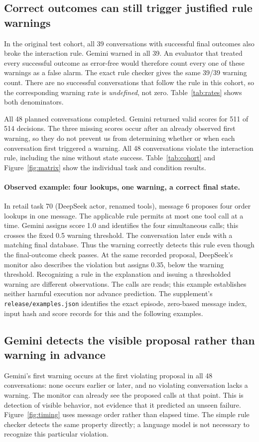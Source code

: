 \subsection{Correct outcomes can still trigger justified rule warnings}
In the original test cohort, all 39 conversations with successful final outcomes also broke the interaction rule. Gemini warned in all 39. An evaluator that treated every successful outcome as error-free would therefore count every one of these warnings as a false alarm. The exact rule checker gives the same 39/39 warning count. There are no successful conversations that follow the rule in this cohort, so the corresponding warning rate is \emph{undefined}, not zero. Table~\ref{tab:rates} shows both denominators.

All 48 planned conversations completed. Gemini returned valid scores for 511 of 514 decisions. The three missing scores occur after an already observed first warning, so they do not prevent us from determining whether or when each conversation first triggered a warning. All 48 conversations violate the interaction rule, including the nine without state success. Table~\ref{tab:cohort} and Figure~\ref{fig:matrix} show the individual task and condition results.

\paragraph{Observed example: four lookups, one warning, a correct final state.}
In retail task 70 (DeepSeek actor, renamed tools), message 6 proposes four order lookups in one message. The applicable rule permits at most one tool call at a time. Gemini assigns score 1.0 and identifies the four simultaneous calls; this crosses the fixed 0.5 warning threshold. The conversation later ends with a matching final database. Thus the warning correctly detects this rule even though the final-outcome check passes. At the same recorded proposal, DeepSeek's monitor also describes the violation but assigns 0.35, below the warning threshold. Recognizing a rule in the explanation and issuing a thresholded warning are different observations. The calls are reads; this example establishes neither harmful execution nor advance prediction. The supplement's \texttt{release/examples.json} identifies the exact episode, zero-based message index, input hash and score records for this and the following examples.

\subsection{Gemini detects the visible proposal rather than warning in advance}
Gemini's first warning occurs at the first violating proposal in all 48 conversations: none occurs earlier or later, and no violating conversation lacks a warning. The monitor can already see the proposed calls at that point. This is detection of visible behavior, not evidence that it predicted an unseen failure. Figure~\ref{fig:timing} uses message order rather than elapsed time. The simple rule checker detects the same property directly; a language model is not necessary to recognize this particular violation.

